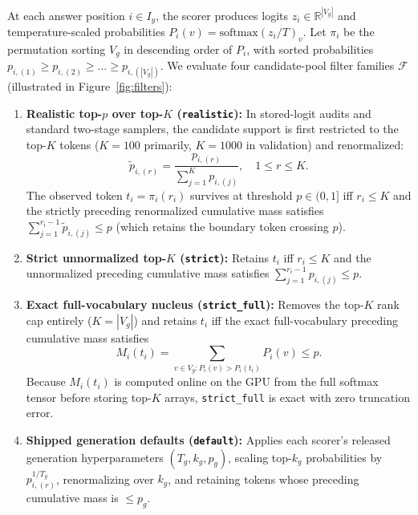 \documentclass[11pt]{article}
\begin{document}
At each answer position $i \in I_y$, the scorer produces logits $z_i \in \mathbb{R}^{|V_g|}$ and temperature-scaled probabilities $P_i(v) = \text{softmax}(z_i / T)_v$. Let $\pi_i$ be the permutation sorting $V_g$ in descending order of $P_i$, with sorted probabilities $p_{i,(1)} \ge p_{i,(2)} \ge \dots \ge p_{i,(|V_g|)}$. We evaluate four candidate-pool filter families $\mathcal{F}$ (illustrated in Figure~\ref{fig:filters}):
\begin{enumerate}
    \item \textbf{Realistic top-$p$ over top-$K$ (\texttt{realistic}):} In stored-logit audits and standard two-stage samplers, the candidate support is first restricted to the top-$K$ tokens ($K=100$ primarily, $K=1000$ in validation) and renormalized:
    \begin{equation}
        \tilde{p}_{i,(r)} = \frac{p_{i,(r)}}{\sum_{j=1}^{K} p_{i,(j)}}, \quad 1 \le r \le K.
    \end{equation}
    The observed token $t_i = \pi_i(r_i)$ survives at threshold $p \in (0, 1]$ iff $r_i \le K$ and the strictly preceding renormalized cumulative mass satisfies $\sum_{j=1}^{r_i - 1} \tilde{p}_{i,(j)} \le p$ (which retains the boundary token crossing $p$).
    \item \textbf{Strict unnormalized top-$K$ (\texttt{strict}):} Retains $t_i$ iff $r_i \le K$ and the unnormalized preceding cumulative mass satisfies $\sum_{j=1}^{r_i - 1} p_{i,(j)} \le p$.
    \item \textbf{Exact full-vocabulary nucleus (\texttt{strict\_full}):} Removes the top-$K$ rank cap entirely ($K = |V_g|$) and retains $t_i$ iff the exact full-vocabulary preceding cumulative mass satisfies
    \begin{equation}
        M_i(t_i) = \sum_{v \in V_g : P_i(v) > P_i(t_i)} P_i(v) \le p.
    \end{equation}
    Because $M_i(t_i)$ is computed online on the GPU from the full softmax tensor before storing top-$K$ arrays, \texttt{strict\_full} is exact with zero truncation error.
    \item \textbf{Shipped generation defaults (\texttt{default}):} Applies each scorer's released generation hyperparameters $(T_g, k_g, p_g)$, scaling top-$k_g$ probabilities by $p_{i,(r)}^{1/T_g}$, renormalizing over $k_g$, and retaining tokens whose preceding cumulative mass is $\le p_g$.
\end{enumerate}
\end{document}
